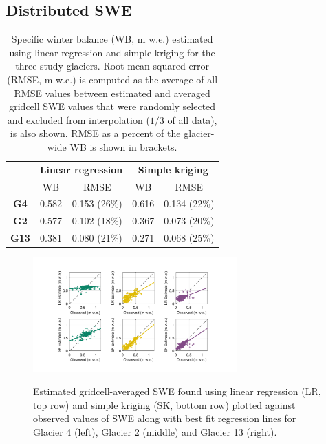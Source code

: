 \documentclass[twocolumn, letterpaper]{igs}
\begin{document}
\subsection{Distributed SWE}
 
 \begin{table}[]
\centering
\caption{Specific winter balance (WB, m w.e.) estimated using linear regression and simple kriging for the three study glaciers. Root mean squared error (RMSE, m w.e.) is computed as the average of all RMSE values between estimated and averaged gridcell SWE values that were randomly selected and excluded from interpolation ($1/3$ of all data), is also shown. RMSE as a percent of the glacier-wide WB is shown in brackets.}
\label{tab:WSMB&RMSE}
\begin{tabular}{c|cc|cc}
\hline
 & \multicolumn{2}{c|}{\textbf{Linear regression}} & \multicolumn{2}{c}{\textbf{Simple kriging}} \\
 & WB & RMSE & WB & RMSE \\ \hline
\textbf{G4} & 0.582 & 0.153 (26\%) & 0.616 & 0.134 (22\%) \\
\textbf{G2} & 0.577 & 0.102 (18\%) & 0.367 & 0.073 (20\%) \\
\textbf{G13} & 0.381 & 0.080 (21\%) & 0.271 & 0.068 (25\%)
\end{tabular}
\end{table}

\begin{figure}
	\centering
	\includegraphics[width =0.7\textwidth]{observedVSestimated_S2.pdf}\\
	\caption{Estimated gridcell-averaged SWE found using linear regression (LR, top row) and simple kriging (SK, bottom row) plotted against observed values of SWE along with best fit regression lines for Glacier 4 (left), Glacier 2 (middle) and Glacier 13 (right).}
	\label{fig:observedVSestimated_S2}
\end{figure}
\end{document}
